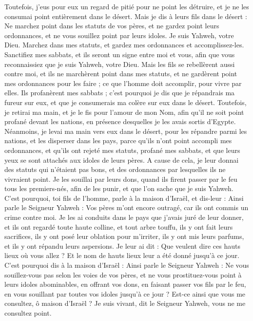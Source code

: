 \begin{multicols}{2}
Toutefois, j'eus pour eux un regard de pitié pour ne point les détruire, et je ne les consumai point entièrement dans le désert.
Mais je dis à leurs fils dans le désert : Ne marchez point dans les statuts de vos pères, et ne gardez point leurs ordonnances, et ne vous souillez point par leurs idoles.
Je suis Yahweh, votre Dieu. Marchez dans mes statuts, et gardez mes ordonnances et accomplissez-les.
Sanctifiez mes sabbats, et ils seront un signe entre moi et vous, afin que vous reconnaissiez que je suis Yahweh, votre Dieu.
Mais les fils se rebellèrent aussi contre moi, et ils ne marchèrent point dans mes statuts, et ne gardèrent point mes ordonnances pour les faire ; ce que l'homme doit accomplir, pour vivre par elles. Ils profanèrent mes sabbats ; c'est pourquoi je dis que je répandrais ma fureur sur eux, et que je consumerais ma colère sur eux dans le désert.
Toutefois, je retirai ma main, et je le fis pour l'amour de mon Nom, afin qu'il ne soit point profané devant les nations, en présence desquelles je les avais sortis d'Egypte.
Néanmoins, je levai ma main vers eux dans le désert, pour les répandre parmi les nations, et les disperser dans les pays,
parce qu'ils n'ont point accompli mes ordonnances, et qu'ils ont rejeté mes statuts, profané mes sabbats, et que leurs yeux se sont attachés aux idoles de leurs pères.
A cause de cela, je leur donnai des statuts qui n'étaient pas bons, et des ordonnances par lesquelles ils ne vivraient point.
Je les souillai par leurs dons, quand ils firent passer par le feu tous les premiers-nés, afin de les punir, et que l'on sache que je suis Yahweh.
C'est pourquoi, toi fils de l'homme, parle à la maison d'Israël, et dis-leur : Ainsi parle le Seigneur Yahweh : Vos pères m'ont encore outragé, car ils ont commis un crime contre moi.
Je les ai conduits dans le pays que j'avais juré de leur donner, et ils ont regardé toute haute colline, et tout arbre touffu, ils y ont fait leurs sacrifices, ils y ont posé leur oblation pour m'irriter, ils y ont mis leurs parfums, et ils y ont répandu leurs aspersions.
Je leur ai dit : Que veulent dire ces hauts lieux où vous allez ? Et le nom de hauts lieux leur a été donné jusqu'à ce jour.
C'est pourquoi dis à la maison d'Israël : Ainsi parle le Seigneur Yahweh : Ne vous souillez-vous pas selon les voies de vos pères, et ne vous prostituez-vous point à leurs idoles abominables,
en offrant vos dons, en faisant passer vos fils par le feu, en vous souillant par toutes vos idoles jusqu'à ce jour ? Est-ce ainsi que vous me consultez, ô maison d'Israël ? Je suis vivant, dit le Seigneur Yahweh, vous ne me consultez point.

\end{multicols}
